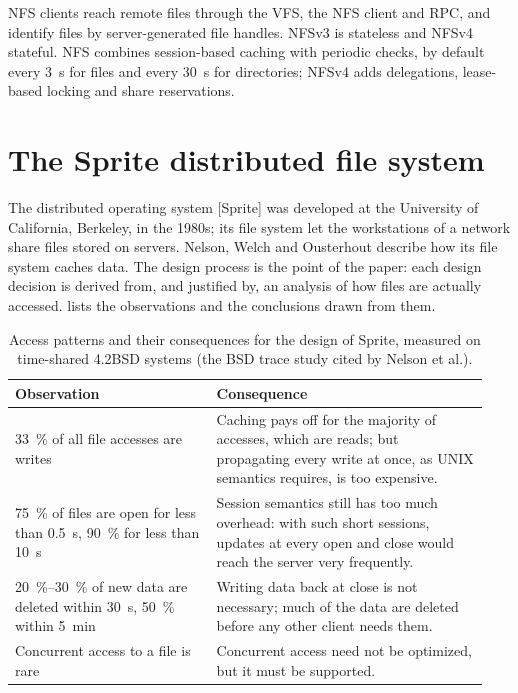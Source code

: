 \documentclass[../main.tex]{subfiles}
\begin{document}
\begin{keypoint}
  NFS clients reach remote files through the VFS, the NFS client and RPC,
  and identify files by server-generated file handles.  NFSv3 is
  stateless and NFSv4 stateful.  NFS combines session-based caching with
  periodic checks, by default every \SI{3}{\second} for files and every
  \SI{30}{\second} for directories; NFSv4 adds delegations, lease-based
  locking and share reservations.
\end{keypoint}

\section{The Sprite distributed file system}
\label{sec:l14-sprite}

The distributed operating system [Sprite] was developed at
the University of California, Berkeley, in the 1980s; its file system let
the workstations of a network share files stored on servers.  Nelson,
Welch and Ousterhout \cite{nelson1988} describe how its file system caches
data.  The design process is the point of the paper: each design decision
is derived from, and justified by, an analysis of how files are actually
accessed.   lists the
observations and the conclusions drawn from them.

\begin{table}[htbp]
  \centering
  \caption{Access patterns and their consequences for the design of
    Sprite, measured on time-shared 4.2BSD systems (the BSD trace study
    \cite{ousterhout1985} cited by Nelson et al.).}
  \label{tab:l14-sprite-analysis}
  \small
  \begin{tabular}{@{}>{\raggedright\arraybackslash}p{0.4\linewidth}>{\raggedright\arraybackslash}p{0.54\linewidth}@{}}
    \toprule
    Observation & Consequence \\
    \midrule
    \SI{33}{\percent} of all file accesses are writes & Caching pays off
      for the majority of accesses, which are reads; but propagating every
      write at once, as UNIX semantics requires, is too expensive. \\
    \SI{75}{\percent} of files are open for less than \SI{0.5}{\second},
      \SI{90}{\percent} for less than \SI{10}{\second} & Session semantics
      still has too much overhead: with such short sessions, updates at
      every open and close would reach the server very frequently. \\
    \SIrange{20}{30}{\percent} of new data are deleted within
      \SI{30}{\second}, \SI{50}{\percent} within \SI{5}{\minute} & Writing
      data back at close is not necessary; much of the data are deleted
      before any other client needs them. \\
    Concurrent access to a file is rare & Concurrent access need not be
      optimized, but it must be supported. \\
    \bottomrule
  \end{tabular}
\end{table}
\end{document}
